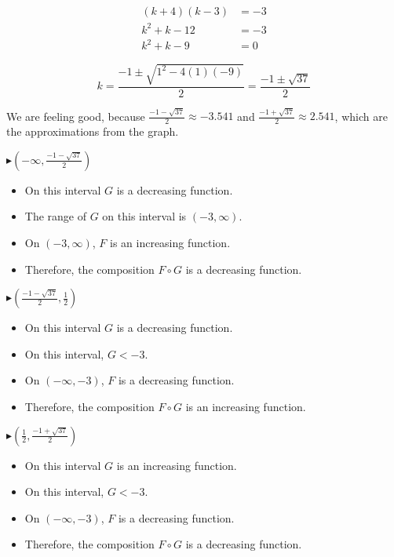 \documentclass{ximera}
\begin{document}
\begin{example}
\begin{align*}
(k+4)(k-3) & = -3 \\
 k^2 + k - 12           & = -3  \\
 k^2 + k - 9         & = 0
\end{align*}


\[
k = \frac{-1 \pm \sqrt{1^2 - 4 (1) (-9)}}{2} = \frac{-1 \pm \sqrt{37}}{2} 
\]


We are feeling good, because $\frac{-1 - \sqrt{37}}{2} \approx -3.541$ and $\frac{-1 + \sqrt{37}}{2} \approx 2.541$, which are the approximations from the graph.






\textbf{\textcolor{blue!55!black}{$\blacktriangleright (-\infty, \frac{-1 - \sqrt{37}}{2})$}}


\begin{itemize}
\item On this interval $G$ is a decreasing function.
\item The range of $G$ on this interval is $(-3, \infty)$.
\item On $(-3, \infty)$, $F$ is an increasing function.
\item Therefore, the composition $F \circ G$ is a decreasing function.
\end{itemize}









\textbf{\textcolor{blue!55!black}{$\blacktriangleright (\frac{-1 - \sqrt{37}}{2}, \frac{1}{2})$}}


\begin{itemize}
\item On this interval $G$ is a decreasing function.
\item On this interval, $G < -3$.
\item On $(-\infty, -3)$, $F$ is a decreasing function.
\item Therefore, the composition $F \circ G$ is an increasing function.
\end{itemize}








\textbf{\textcolor{blue!55!black}{$\blacktriangleright (\frac{1}{2}, \frac{-1 + \sqrt{37}}{2})$}}


\begin{itemize}
\item On this interval $G$ is an increasing function.
\item On this interval, $G < -3$.
\item On $(-\infty, -3)$, $F$ is a decreasing function.
\item Therefore, the composition $F \circ G$ is a decreasing function.
\end{itemize}











\end{example}
\end{document}
